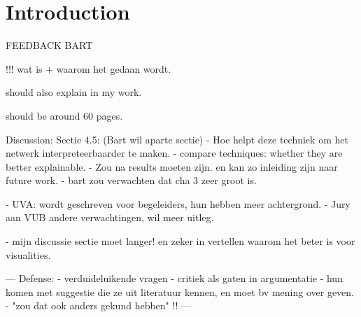 \chapter{Introduction}

\setcounter{page}{1} %


FEEDBACK BART

!!!
wat is + waarom het gedaan wordt.

should also explain in my work.

should be around 60 pages.

Discussion:
Sectie 4.5: (Bart wil aparte sectie)
- Hoe helpt deze techniek om het netwerk interpreteerbaarder te maken.
- compare techniques: whether they are better explainable.
- Zou na results moeten zijn. en kan zo inleiding zijn naar future work.
- bart zou verwachten dat cha 3 zeer groot is.

- UVA: wordt geschreven voor begeleiders, hun hebben meer achtergrond.
- Jury aan VUB andere verwachtingen, wil meer uitleg.

- mijn discussie sectie moet langer! en zeker in vertellen waarom het beter is voor visualities.

---
Defense:
- verduideluikende vragen
- critiek als gaten in argumentatie
- hun komen met suggestie die ze uit literatuur kennen, en moet bv mening over geven.
- "zou dat ook anders gekund hebben"
!!
---




